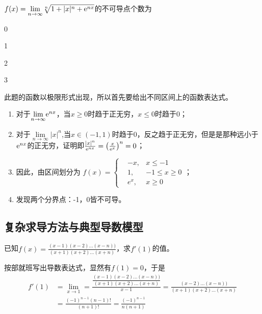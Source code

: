\begin{problem}
	$f(x)=\underset{ n\rightarrow \infty}{\lim}\sqrt[n]{1+|x|^n+{\rm e}^{nx}}$的不可导点个数为\xparen
	\begin{xchoices}[showanswer=true]
		\item 0
		\item 1
		\item* 2
		\item 3
	\end{xchoices}
\vspace{0.5em}
\begin{solution}
	此题的函数以极限形式出现，所以首先要给出不同区间上的函数表达式。
	
	\begin{enumerate}[label=(\arabic*)]
		\item 对于$\underset{ n\rightarrow \infty}{\lim}{\rm e}^{nx}$，当$x\ge 0$时趋于正无穷，$x\le 0$时趋于0；
		\item 对于$\underset{ n\rightarrow \infty}{\lim}|x|^n$,当$x\in(-1,1)$时趋于0，反之趋于正无穷，但是是那种远小于${\rm e}^{nx}$的正无穷，证明即$\frac{|x|^n}{{\rm e}^{nx}}=\qty(\frac{x}{{\rm e}^x})^n=0$；
		\item 因此，由区间划分为
		$ f(x)=\left\{
		\begin{aligned}
			&-x,&x\le -1\\
			&1,&-1\leq x\geq 0\\
			&e^x,&x\ge 0
		\end{aligned}
		\right.
		$；
		\item 发现两个分界点：-1，0皆不可导。
	\end{enumerate}
\end{solution}
\end{problem}

\subsection{复杂求导方法与典型导数模型}\label{sec:1.3.4}

\begin{problem}
	已知$f(x)=\frac{(x-1)(x-2)...(x-n))}{(x+1)(x+2)...(x+n)}$，求$f'(1)$的值。
	\vspace{0.3em}
	\begin{solution}
		按部就班写出导数表达式，显然有$f(1)=0$，于是
		\begin{align*}
			f'(1)&=\underset{ x\rightarrow 1}{\lim}=\frac{\dfrac{(x-1)(x-2)...(x-n))}{(x+1)(x+2)...(x+n)}}{x-1}=\frac{(x-2)...(x-n))}{(x+1)(x+2)...(x+n)}\\
			&=\frac{(-1)^{n-1}(n-1)!}{(n+1)!}=\frac{(-1)^{n-1}}{n(n+1)}
		\end{align*}
	\end{solution}
\end{problem}

